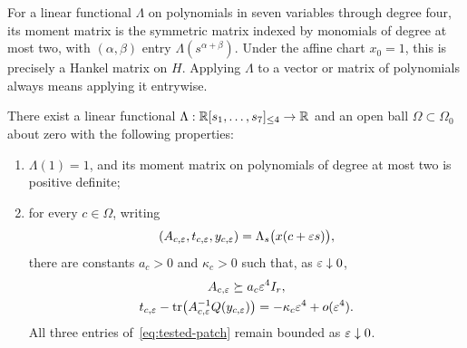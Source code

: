 For a linear functional $\Lambda$ on polynomials in seven variables through
degree four, its moment matrix is the symmetric matrix indexed by monomials
of degree at most two, with $(\alpha,\beta)$ entry
$\Lambda(s^{\alpha+\beta})$.  Under the affine chart $x_0=1$, this is
precisely a Hankel matrix on $H$.  Applying $\Lambda$ to a vector or matrix
of polynomials always means applying it entrywise.

\begin{lemma}
 \label{lem:moment-violation}
There exist a linear functional
$\Lambda:\mathbb R[s_1,\ldots,s_7]_{\le4}\to\mathbb R$ and an open ball
$\Omega\subset\Omega_0$ about zero with the following properties:
\begin{enumerate}
 \item $\Lambda(1)=1$, and its moment matrix on polynomials of degree at
 most two is positive definite;
 \item for every $c\in\Omega$, writing
 \begin{equation}
  \label{eq:tested-patch}
  (A_{c,\varepsilon},t_{c,\varepsilon},y_{c,\varepsilon})
  =\Lambda_s\bigl(x(c+\varepsilon s)\bigr),
 \end{equation}
 there are constants $a_c>0$ and $\kappa_c>0$ such that, as
 $\varepsilon\downarrow0$,
 \begin{gather}
  \label{eq:deformation-lower-bound}
  A_{c,\varepsilon}\succeq a_c\varepsilon^4 I_r,\\
  \label{eq:deformation-violation}
  t_{c,\varepsilon}-\operatorname{tr}\bigl(A_{c,\varepsilon}^{-1}Q(y_{c,\varepsilon})\bigr)
  =-\kappa_c\varepsilon^4+o(\varepsilon^4).
 \end{gather}
 All three entries of~\eqref{eq:tested-patch} remain bounded as
 $\varepsilon\downarrow0$.
\end{enumerate}
\end{lemma}


